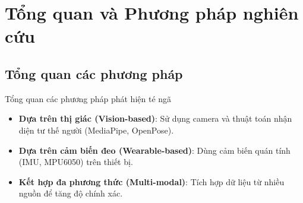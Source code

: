 \section{Tổng quan và Phương pháp nghiên cứu}

\subsection{Tổng quan các phương pháp}
\begin{frame}{Tổng quan các phương pháp phát hiện té ngã}
    \begin{itemize}
        \item \textbf{Dựa trên thị giác (Vision-based)}: Sử dụng camera và thuật toán nhận diện tư thế người (MediaPipe, OpenPose).
        \item \textbf{Dựa trên cảm biến đeo (Wearable-based)}: Dùng cảm biến quán tính (IMU, MPU6050) trên thiết bị.
        \item \textbf{Kết hợp đa phương thức (Multi-modal)}: Tích hợp dữ liệu từ nhiều nguồn để tăng độ chính xác.
    \end{itemize}
\end{frame}


